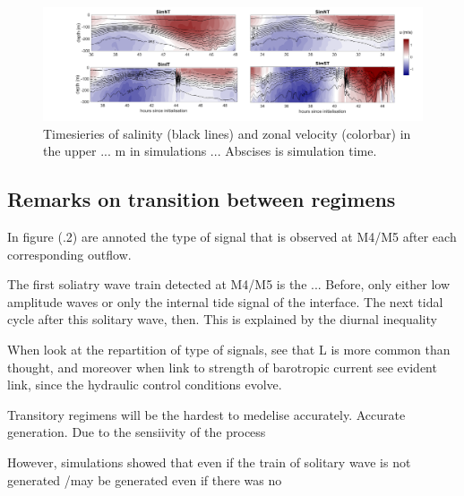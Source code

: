 \begin{figure}[!h]
 \includegraphics[width=\textwidth]{./GBR3D/US_M4SimMIV.png}
 \caption {Timesieries of salinity (black lines) and zonal velocity (colorbar) in the upper ... m in simulations ... Abscises is simulation time.}
 \label{Fig_moor_USs}
\end{figure}














\subsection{Remarks on transition between regimens}

In figure (.2) are annoted the type of signal that is observed at M4/M5 after each corresponding outflow.

The first soliatry wave train detected at M4/M5 is the ... Before, only either low amplitude waves or only the internal tide signal of the interface. The next tidal cycle after this solitary wave, then. This is explained by the diurnal inequality


When look at the repartition of type of signals, see that L is more common than thought, and moreover when link to strength of barotropic current see evident link, since the hydraulic control conditions evolve.


Transitory regimens will be the hardest to medelise accurately. Accurate generation. Due to the sensiivity of the process

However, simulations showed that even if the train of solitary wave is not generated /may be generated even if there was no 


